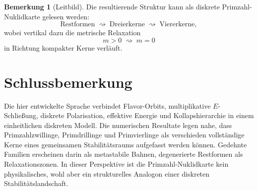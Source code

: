 \documentclass[11pt,a4paper]{article}
\theoremstyle{definition}
\newtheorem{remark}[definition]{Bemerkung}
\theoremstyle{plain}
\begin{document}
	\begin{remark}[Leitbild]
		Die resultierende Struktur kann als diskrete Primzahl-Nuklidkarte gelesen werden:
		\[
		\text{Restformen}
		\;\rightsquigarrow\;
		\text{Dreierkerne}
		\;\rightsquigarrow\;
		\text{Viererkerne},
		\]
		wobei vertikal dazu die metrische Relaxation
		\[
		m>0 \;\rightsquigarrow\; m=0
		\]
		in Richtung kompakter Kerne verläuft.
	\end{remark}
	
	\section{Schlussbemerkung}
	
	Die hier entwickelte Sprache verbindet Flavor-Orbits, multiplikative $E$-Schließung, diskrete Polarisation, effektive Energie und Kollapshierarchie in einem einheitlichen diskreten Modell. Die numerischen Resultate legen nahe, dass Primzahlzwillinge, Primdrillinge und Primvierlinge als verschieden vollständige Kerne eines gemeinsamen Stabilitätsraums aufgefasst werden können. Gedehnte Familien erscheinen darin als metastabile Bahnen, degenerierte Restformen als Relaxationszonen. In dieser Perspektive ist die Primzahl-Nuklidkarte kein physikalisches, wohl aber ein strukturelles Analogon einer diskreten Stabilitätslandschaft.
	
\end{document}
